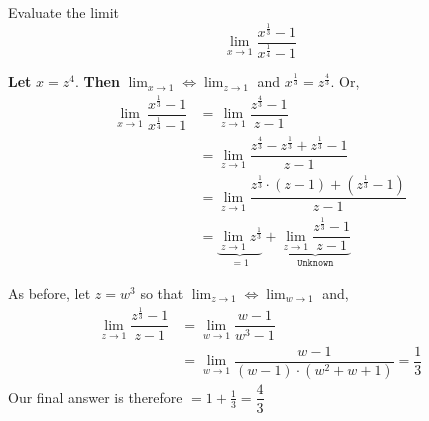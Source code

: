 

\question[4] Evaluate the limit \[ \lim_{x\to 1}\dfrac{x^{\frac{1}{3}}-1}{x^{\frac{1}{4}}-1}\]

\begin{solution}[\halfpage]
  \textbf{Let} $x = z^4$. \textbf{Then} $\lim_{x\to 1} \Longleftrightarrow \lim_{z\to 1}$ and $x^{\frac{1}{3}} = z^{\frac{4}{3}}$. Or, 
  \begin{align}
    \lim_{x\to 1}\dfrac{x^{\frac{1}{3}} - 1}{x^{\frac{1}{4}} - 1} &= 
    \lim_{z\to 1}\dfrac{z^{\frac{4}{3}} - 1}{z - 1} \\
    &=\lim_{z\to 1}\dfrac{z^{\frac{4}{3}} - z^{\frac{1}{3}} + z^{\frac{1}{3}} - 1}{z - 1} \\
    &= \lim_{z\to 1}\dfrac{z^{\frac{1}{3}}\cdot (z-1) + (z^{\frac{1}{3}} - 1)}{z-1} \\
    &= \underbrace{\lim_{z\to 1}z^{\frac{1}{3}}}_{= 1} + 
    \underbrace{\lim_{z\to 1}\dfrac{z^{\frac{1}{3}} - 1}{z-1}}_{\texttt{Unknown}}
  \end{align}
  
  As before, let $z = w^3$ so that $\lim_{z\to 1}\Longleftrightarrow\lim_{w\to 1}$ and, 
  \begin{align}
    \lim_{z\to 1}\dfrac{z^{\frac{1}{3}}-1}{z-1} &= \lim_{w\to 1}\dfrac{w-1}{w^3-1} \\
    &= \lim_{w\to 1}\dfrac{w-1}{(w-1)\cdot (w^2+w+1)} = \dfrac{1}{3}
  \end{align}
  Our final answer is therefore $= 1+\frac{1}{3} = \dfrac{4}{3}$
\end{solution}
